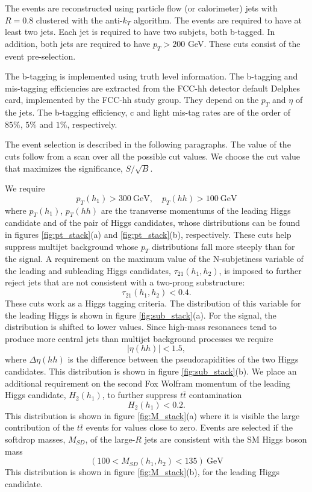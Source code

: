 The events are reconstructed using particle flow (or calorimeter) jets with $R=0.8$ clustered with the anti-$k_T$ algorithm. The events are required to have at least two jets. Each jet is required to have two subjets, both b-tagged. In addition, both jets are required to have $p_T>200$ GeV. These cuts consist of the event pre-selection.

The b-tagging is implemented using truth level information. The b-tagging and mis-tagging efficiencies are extracted from the FCC-hh detector default Delphes card, implemented by the FCC-hh study group. They depend on the $p_T$ and $\eta$ of the jets. The b-tagging efficiency, c and light mis-tag rates are of the order of $85\%$, $5\%$ and $1\%$, respectively.

The event selection is described in the following paragraphs. The value of the cuts follow from a scan over all the possible cut values. We choose the cut value that maximizes the significance, $S/\sqrt{B}$. 

We require
\begin{equation}
	p_T(h_1)>300~\text{GeV}, \quad p_T(hh)>100 ~\text{GeV}
\end{equation}
where $p_T(h_1)$, $p_T(hh)$ are the transverse momentums of the leading Higgs candidate and of the pair of Higgs candidates, whose distributions can be found in figures \ref{fig:pt_stack}(a) and \ref{fig:pt_stack}(b), respectively.
These cuts help suppress multijet background whose $p_T$ distributions fall more steeply than for the signal. A requirement on the maximum value of the N-subjetiness variable of the leading and subleading Higgs candidates, $\tau_{21}(h_1,h_2)$, is imposed to further reject jets that are not consistent with a two-prong substructure:
\begin{equation}
	\tau_{21}(h_1,h_2)<0.4.
\end{equation}
These cuts work as a Higgs tagging criteria. The distribution of this variable for the leading Higgs is shown in figure \ref{fig:sub_stack}(a). For the signal, the distribution is shifted to lower values.
Since high-mass resonances tend to produce more central jets than multijet background processes we require
\begin{equation}
	|\eta(hh)|<1.5,
\end{equation}
where $\Delta\eta(hh)$ is the difference between the pseudorapidities of the two Higgs candidates. This distribution is shown in figure \ref{fig:sub_stack}(b).
We place an additional requirement on the second Fox Wolfram momentum of the leading Higgs candidate, $H_2(h_1)$, to further suppress $t\overline{t}$ contamination
\begin{equation}
	H_2(h_1)<0.2.
\end{equation}
This distribution is shown in figure \ref{fig:M_stack}(a) where it is visible the large contribution of the $t\overline{t}$ events for values close to zero. 
Events are selected if the softdrop masses, $M_{SD}$, of the large-$R$ jets are consistent with the SM Higgs boson mass
\begin{equation}
	(100<M_{SD}(h_1,h_2)<135) ~\text{GeV}
\end{equation}
This distribution is shown in figure \ref{fig:M_stack}(b), for the leading Higgs candidate. 

